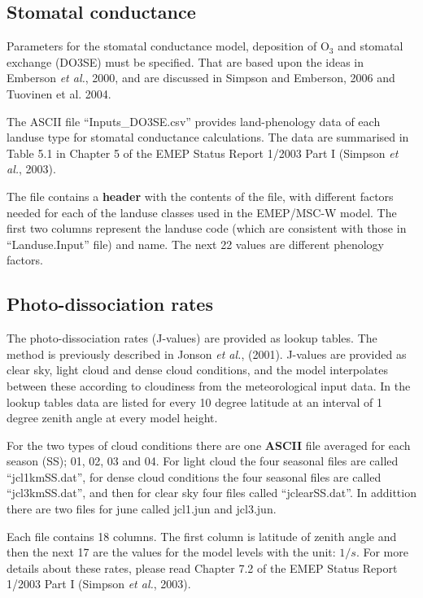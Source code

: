 \subsection{Stomatal conductance}
Parameters for the stomatal conductance model, deposition of O$_{3}$ and
stomatal exchange (DO3SE) must be specified. That are based upon the ideas in
Emberson {\sl et al.}, 2000, and are discussed in Simpson and Emberson,
2006 and Tuovinen et al. 2004.

The  ASCII file ``Inputs\_DO3SE.csv'' provides land-phenology data
of each landuse type for stomatal conductance calculations. The 
data are summarised in Table 5.1 in Chapter 5 of the EMEP 
Status Report 1/2003 Part I (Simpson {\sl et al.}, 2003).

The file contains a {\bf header} with the contents of the file,
with different factors needed for each of the landuse classes used
in the EMEP/MSC-W model. The first two columns represent the
landuse code (which are consistent with those in ``Landuse.Input'' file)
and name. The next 22 values are different phenology factors.


\subsection{Photo-dissociation rates}
The photo-dissociation rates (J-values) are provided as lookup
tables. The method is previously described in Jonson {\sl et
al.}, (2001). J-values are provided as clear sky, light cloud and dense
cloud conditions, and the model interpolates between these according
to cloudiness from the meteorological input data. In the lookup tables
data are listed for every 10 degree latitude at an interval of 1
degree zenith angle at every model height.

For the two types of cloud conditions there are one {\bf ASCII} file 
averaged for each season (SS); 01, 02, 03 and 04. 
For light cloud the four seasonal files are called ``jcl1kmSS.dat'', for dense cloud conditions
the four seasonal files are called ``jcl3kmSS.dat'', and then for clear sky four files 
called ``jclearSS.dat''. In addittion there are two files for june called jcl1.jun 
and jcl3.jun.

Each file contains 18 columns. The first column is latitude of zenith 
angle and then the
next 17 are the values for the model levels with the unit: $1/s$. 
For more details about these rates, please read Chapter 7.2 of the EMEP
Status Report 1/2003 Part I (Simpson {\sl et al.}, 2003).

